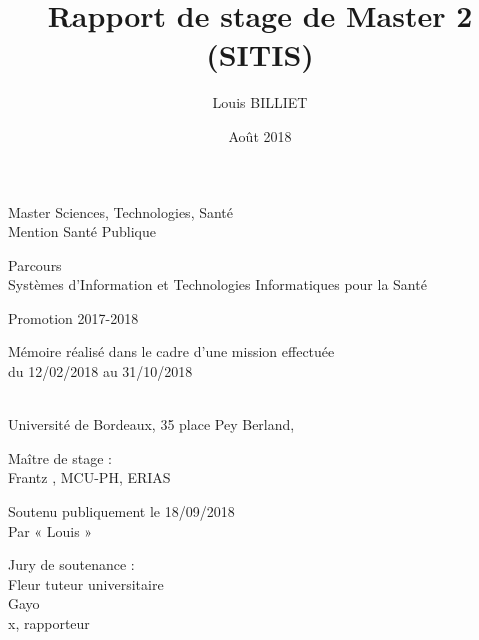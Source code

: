\documentclass[a4paper, 11pt, openany, oneside, abstract=on]{report}
\title{Rapport de stage de Master 2 (SITIS)}
\author{Louis BILLIET }
\date{Août 2018}
\begin{document}

\begin{bf}
Master Sciences, Technologies, Santé
\\Mention Santé Publique

Parcours
\\Systèmes d’Information et Technologies Informatiques pour la Santé

Promotion 2017-2018

\setlength{\fboxsep}{4mm}%

\setlength{\fboxrule}{2mm}%

Mémoire réalisé dans le cadre d’une mission effectuée
\\du 12/02/2018 au 31/10/2018

\\Université de Bordeaux, 35 place Pey Berland, 

Maître de stage :
\\Frantz {}, MCU-PH, ERIAS

Soutenu publiquement le 18/09/2018
\\Par « Louis  »

Jury de soutenance :
\\Fleur {} tuteur universitaire
\\Gayo {}
\\ x, rapporteur
\end{bf}
\end{document}
